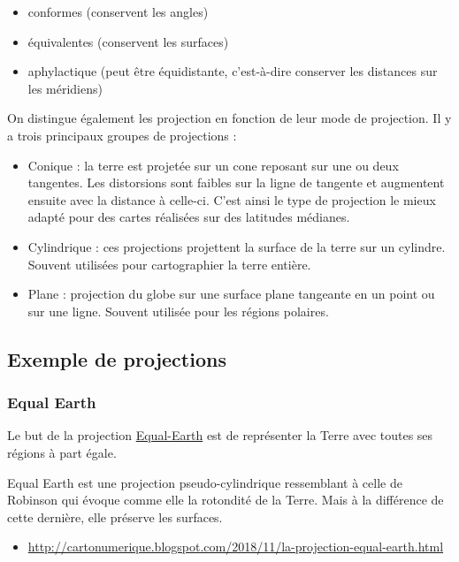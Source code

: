 \documentclass[
]{book}
\providecommand{\tightlist}{%
  \setlength{\itemsep}{0pt}\setlength{\parskip}{0pt}}
\begin{document}
\begin{itemize}
\tightlist
\item
  conformes (conservent les angles)
\item
  équivalentes (conservent les surfaces)
\item
  aphylactique (peut être équidistante, c'est-à-dire conserver les distances sur les méridiens)
\end{itemize}

On distingue également les projection en fonction de leur mode de projection. Il y a trois principaux groupes de projections :

\begin{itemize}
\item
  Conique : la terre est projetée sur un cone reposant sur une ou deux tangentes. Les distorsions sont faibles sur la ligne de tangente et augmentent ensuite avec la distance à celle-ci. C'est ainsi le type de projection le mieux adapté pour des cartes réalisées sur des latitudes médianes.
\item
  Cylindrique : ces projections projettent la surface de la terre sur un cylindre. Souvent utilisées pour cartographier la terre entière.
\item
  Plane : projection du globe sur une surface plane tangeante en un point ou sur une ligne. Souvent utilisée pour les régions polaires.
\end{itemize}

\hypertarget{exemple-de-projections}{%
\subsection{Exemple de projections}\label{exemple-de-projections}}

\hypertarget{equal-earth}{%
\subsubsection{Equal Earth}\label{equal-earth}}

Le but de la projection \href{http://equal-earth.com}{Equal-Earth} est de représenter la Terre avec toutes ses régions à part égale.

Equal Earth est une projection pseudo-cylindrique ressemblant à celle de Robinson qui évoque comme elle la rotondité de la Terre. Mais à la différence de cette dernière, elle préserve les surfaces.

\begin{itemize}
\tightlist
\item
  \url{http://cartonumerique.blogspot.com/2018/11/la-projection-equal-earth.html}
\end{itemize}
\end{document}
